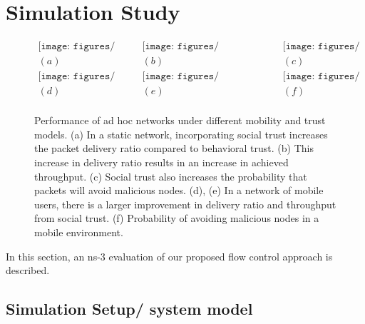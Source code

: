 \documentclass[conference]{IEEEtran}
\begin{document}
%
 


	



\section{Simulation Study}
\label{sec:simulation}
 \begin{figure*}[t]
\centering
$\begin{array}{ccc}
\texttt{[image: figures/PDR\_no\_mobility.eps]} &
\texttt{[image: figures/Throughput\_no\_mobility.eps]} & 
\texttt{[image: figures/Figure\_3e\_detection\_static.eps]} \\
(a) & (b) & (c) \\

\texttt{[image: figures/PDR\_mobility.eps]} &
\texttt{[image: figures/Throughput\_mobility.eps]} &
\texttt{[image: figures/Figure\_3f\_detection\_mobility.eps]}\\
 (d) & (e) & (f) \\
\end{array}$
\caption{Performance of ad hoc networks under different mobility and trust models. (a) In a static network, incorporating social trust increases the packet delivery ratio compared to behavioral trust. (b) This increase in delivery ratio results in an increase in achieved throughput.  (c) Social trust also increases the probability that packets will avoid malicious nodes. (d), (e) In a network of mobile users, there is a larger improvement in delivery ratio and throughput from social trust. (f) Probability of avoiding malicious nodes in a mobile environment.}
\label{fig:performance}
\end{figure*}


In this section, an ns-3 \cite{ns3} evaluation of our proposed flow control approach is described.

\subsection{Simulation Setup/ system model}
\label{subsec:simul_setup}
\end{document}
